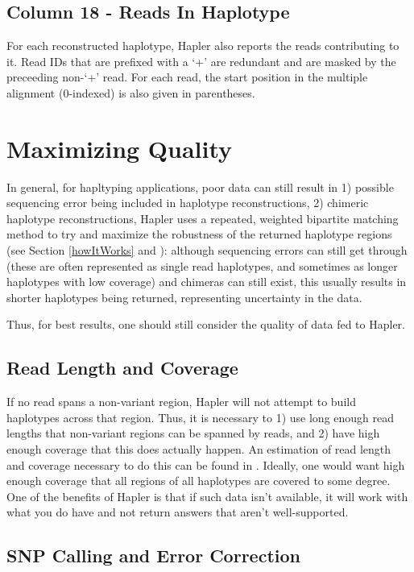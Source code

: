 \documentclass[11pt]{llncs}
\begin{document}
\subsection{Column 18 - Reads In Haplotype}

For each reconstructed haplotype, Hapler also reports the reads contributing to it. Read IDs that are prefixed with a `+' are redundant
and are masked by the preceeding non-`+' read. For each read, the start position in the multiple alignment (0-indexed) is also given in 
parentheses. 


\newpage
\section{Maximizing Quality}
\label{maximizingQuality}

In general, for hapltyping applications, poor data can still result in 1) possible sequencing error being included in haplotype
reconstructions, 2) chimeric haplotype reconstructions, 
Hapler uses a repeated, weighted bipartite matching method to try and maximize the robustness of the returned haplotype regions (see Section 
\ref{howItWorks} and \cite{ONEIL2011}): although sequencing errors can still get through (these are often represented as single read 
haplotypes, and sometimes as longer haplotypes with low coverage) and chimeras can still exist, this usually results in shorter haplotypes being returned,
representing uncertainty in the data.

Thus, for best results, one should still consider the quality of data fed to Hapler.

\subsection{Read Length and Coverage}

If no read spans a non-variant region, Hapler will not attempt to build haplotypes across that region. Thus, it is necessary to 1) use long enough
read lengths that non-variant regions can be spanned by reads, and 2) have high enough coverage that this does actually happen. An estimation of 
read length and coverage necessary to do this can be found in \cite{ERIKSSON2008}. Ideally, one would want high enough coverage that all regions
of all haplotypes are covered to some degree. One of the benefits of Hapler is that if such data isn't available, it will work with what you do have
and not return answers that aren't well-supported.

\subsection{SNP Calling and Error Correction}
\end{document}
